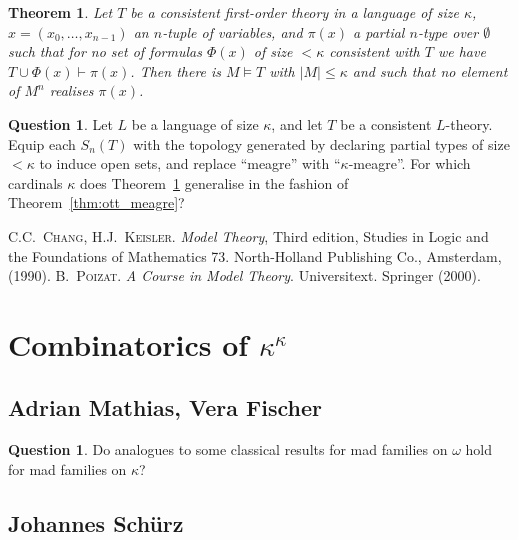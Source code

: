 \documentclass{amsart}
\newtheorem*{theorem*}{Theorem}
\theoremstyle{definition}
\newtheorem{question}[theorem]{Question}
\begin{document}
\begin{theorem*}\label{thm:kappaott}
  Let $T$ be a consistent first-order theory in a language of size $\kappa$, $x=(x_0,\ldots, x_{n-1})$ an $n$-tuple of variables, and $\pi(x)$ a  partial $n$-type over $\emptyset$ such that for no set of formulas $\Phi(x)$ of size $<\kappa$  consistent with $T$ we have $T\cup \Phi(x)\vdash \pi(x)$. Then there is $M\models T$ with $|M|\le \kappa$ and such that no element of $M^n$ realises $\pi(x)$.
\end{theorem*}

\begin{question}
Let $L$ be a language of size $\kappa$, and let $T$ be a consistent $L$-theory.  Equip each $S_n(T)$ with the topology  generated by declaring partial types of size $<\kappa$ to induce open sets, and  replace ``meagre'' with ``$\kappa$-meagre''. For which cardinals $\kappa$ does Theorem~\ref{thm:kappaott} generalise in the fashion of Theorem~\ref{thm:ott_meagre}?
\end{question}

\begin{thebibliography}{0}
C.C.~\textsc{Chang}, H.J.~\textsc{Keisler}.
\newblock \emph{Model Theory},
\newblock Third edition, Studies in Logic and the Foundations of Mathematics 73. North-Holland Publishing Co., Amsterdam, (1990). 
B.~\textsc{Poizat}.
\newblock \emph{A Course in Model Theory}.
\newblock Universitext. Springer (2000).
\end{thebibliography}




\newpage 

\section{Combinatorics of $\kappa^\kappa$} 

\subsection{Adrian Mathias, Vera Fischer} 

\begin{question} 
Do analogues to some classical results for mad families on $\omega$ hold for mad families on $\kappa$? 
\end{question} 


\subsection{Johannes Sch\"urz} 
\end{document}
